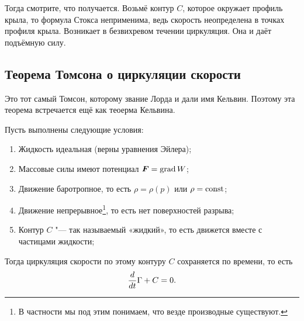 Тогда смотрите, что получается. Возьмё контур $C$, которое окружает профиль крыла, то формула Стокса неприменима, ведь скорость неопределена в точках профиля крыла. Возникает в безвихревом течении циркуляция. Она и даёт подъёмную силу.

\subsection{Теорема Томсона о циркуляции скорости}
Это тот самый Томсон, которому звание Лорда и дали имя Кельвин. Поэтому эта теорема встречается ещё как теоерма Кельвина.
\begin{The}
  Пусть выполнены следующие условия:
\begin{enumerate}
  \item Жидкость идеальная (верны уравнения Эйлера);
  \item Массовые силы имеют потенциал $\boldsymbol{F} = \operatorname{grad} W$;
  \item Движение баротропное, то есть $\rho = \rho(p)$ или $\rho = \operatorname{const}$;
  \item Движение непрерывное\footnote{В частности мы под этим понимаем, что везде производные существуют.}, то есть нет поверхностей разрыва;
  \item Контур $C$ "--- так называемый «жидкий», то есть движется вместе с частицами жидкости;
\end{enumerate}
Тогда циркуляция скорости по этому контуру $C$ сохраняется по времени, то есть
\[
  \frac{d}{dt}\Gamma+C = 0.
\]
\end{The}

